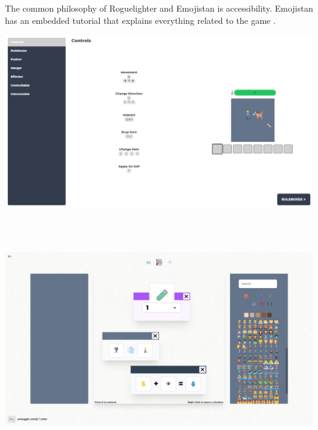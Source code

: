 \documentclass{article}
\begin{document}
The common philosophy of Roguelighter and Emojistan is accessibility. Emojistan has an embedded tutorial that explains everything related to the game \cite{emojistan}.

\begin{minipage}{\linewidth}
    \centering
    \includegraphics[width=1\textwidth]{emojistan-tutorial.jpeg}
\end{minipage}\\\\

\begin{minipage}{\linewidth}
    \centering
    \includegraphics[width=1\textwidth]{emojistan-canvas.jpeg}
\end{minipage}\\\\
\end{document}
